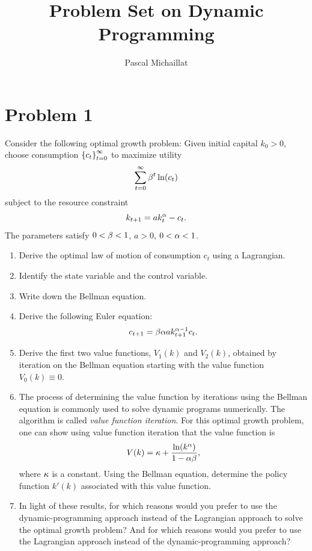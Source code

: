 \documentclass[letterpaper, 11pt, leqno]{article}
\begin{document}
\title{Problem Set on Dynamic Programming}
\author{Pascal Michaillat}
\date{}
\begin{titlepage}
\maketitle
\end{titlepage}

\section*{Problem 1}

Consider the following optimal growth problem: Given initial capital $k_{0}>0$, choose consumption $\left\lbrace c_{t} \right\rbrace _{t =0}^{\infty}$ to maximize utility
\begin{equation*}
\sum_{t=0}^{\infty}\b^{t} \ln{c_{t}}
\end{equation*}
subject to the resource constraint
\begin{equation*}
k_{t+1}=a k_{t}^{\alpha}-c_{t}.
\end{equation*}
The parameters satisfy $0<\beta<1$, $a>0$, $0<\alpha <1$.

\begin{enumerate}
\item Derive the optimal law of motion of consumption $c_{t}$ using a Lagrangian.
\item Identify the state variable and the control variable. 
\item Write down the Bellman equation.
\item Derive the following Euler equation: 
\begin{equation*}
c_{t+1}=\beta  \alpha  a k_{t+1}^{\alpha -1} c_{t}.
\end{equation*}

\item Derive the first two value functions, $V_{1}(k)$ and  $V_{2}(k)$, obtained by iteration on the Bellman equation starting with the value function $V_{0}(k) \equiv 0$. 
\item The process of determining the value function by iterations using the Bellman equation is commonly used to solve dynamic programs numerically. The algorithm is called \textit{value function iteration}. For this optimal growth problem, one can show using value function iteration that the value function is
\[V(k) =\k +\frac{\ln{k^{\a}}}{1-\a \b},\]
where $\kappa$ is a constant. Using the Bellman equation, determine the policy function $k'(k)$ associated with this value function.
\item In light of these results, for which reasons would you prefer to use the dynamic-programming approach instead of the Lagrangian approach to solve the optimal growth problem? And for which reasons would you prefer to use the Lagrangian approach instead of the dynamic-programming approach?
\end{enumerate}
\end{document}
